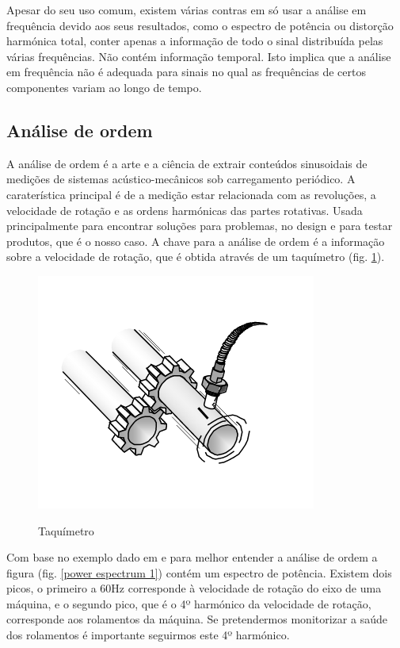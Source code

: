 Apesar do seu uso comum, existem várias contras em só usar a análise em frequência devido aos seus resultados, como o espectro de potência ou distorção harmónica total, conter apenas a informação de todo o sinal distribuída pelas várias frequências. Não contém informação temporal. Isto implica que a análise em frequência não é adequada para sinais no qual as frequências de certos componentes variam ao longo de tempo.
\subsection{Análise de ordem}
A análise de ordem é a arte e a ciência de extrair conteúdos sinusoidais de medições de sistemas acústico-mecânicos sob carregamento periódico. A caraterística principal é de a medição estar relacionada com as revoluções, a velocidade de rotação e as ordens harmónicas das partes rotativas. Usada principalmente para encontrar soluções para problemas, no design e para testar produtos, que é o nosso caso. A chave para a análise de ordem é a informação sobre a velocidade de rotação, que é obtida através de um taquímetro (fig. \ref{taquimetro}).

\begin{figure}[H]
\centering
\includegraphics[scale=0.5]{figs/tacho_signal}
\caption{Taquímetro}\cite{orderAnalysis}\label{taquimetro}
\end{figure}

Com base no exemplo dado em \cite{orderAnalysis2} e para melhor entender a análise de ordem a figura (fig. \ref{power espectrum 1})  contém um espectro de potência. Existem dois picos, o primeiro a 60Hz corresponde à velocidade de rotação do eixo de uma máquina, e o  segundo pico, que é o 4º harmónico da velocidade de rotação, corresponde aos rolamentos da máquina. Se pretendermos monitorizar a saúde dos rolamentos é importante seguirmos este 4º harmónico.

